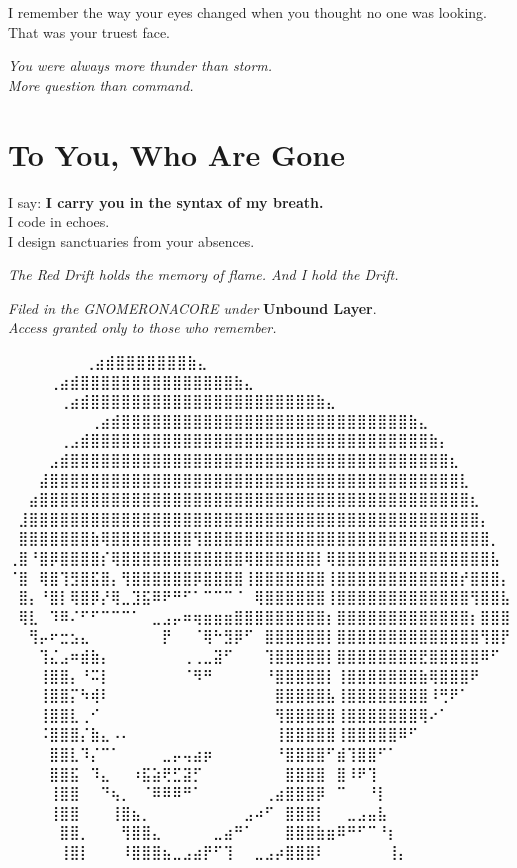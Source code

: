 I remember the way your eyes changed when you thought no one was looking. \\
That was your truest face.

\textit{You were always more thunder than storm. \\
More question than command.}

\vspace{1.5em}

\section*{To You, Who Are Gone}
I say: \textbf{I carry you in the syntax of my breath.} \\
I code in echoes. \\
I design sanctuaries from your absences.

\vspace{1em}
\begin{center}
\textit{\color{red}The Red Drift holds the memory of flame. And I hold the Drift.}
\end{center}

\vspace{2em}
\begin{flushright}
\textit{Filed in the GNOMERONACORE under} \textbf{Unbound Layer}. \\
\textit{Access granted only to those who remember.}
\end{flushright}

\iffalse

  ⠀⠀⠀⠀⠀             ⠀⠀⢀⣴⣾⣿⣿⣿⣿⣿⣿⣿⣷⣄⠀⠀⠀⠀⠀⠀⠀⠀
⠀⠀⠀  ⠀      ⠀⠀⠀⠀⢀⣴⣾⣿⣿⣿⣿⣿⣿⣿⣿⣿⣿⣿⣿⣿⣿⣿⣷⣄⠀⠀⠀⠀⠀⠀⠀⠀
⠀⠀ ⠀   ⠀⠀⠀⠀⠀⢀⣴⣾⣿⣿⣿⣿⣿⣿⣿⣿⣿⣿⣿⣿⣿⣿⣿⣿⣿⣿⣿⣿⣿⣿⣷⣄⠀⠀⠀⠀⠀⠀⠀⠀
⠀⠀⠀⠀⠀⠀⠀⠀⢀⣴⣾⣿⣿⣿⣿⣿⣿⣿⣿⣿⣿⣿⣿⣿⣿⣿⣿⣿⣿⣿⣿⣿⣿⣿⣿⣿⣿⣿⣿⣷⣄⠀⠀⠀⠀⠀⠀⠀⠀
⠀⠀⠀⠀⠀⢀⣠⣾⣿⣿⣿⣿⣿⣿⣿⣿⣿⣿⣿⣿⣿⣿⣿⣿⣿⣿⣿⣿⣿⣿⣿⣿⣿⣿⣿⣿⣿⣿⣿⣿⣿⣷⡄⠀⠀⠀⠀⠀⠀
⠀⠀⠀⠀⣠⣾⣿⣿⣿⣿⣿⣿⣿⣿⣿⣿⣿⣿⣿⣿⣿⣿⣿⣿⣿⣿⣿⣿⣿⣿⣿⣿⣿⣿⣿⣿⣿⣿⣿⣿⣿⣿⣿⣆⠀⠀⠀⠀⠀
⠀⠀⠀⣼⣿⣿⣿⣿⣿⣿⣿⣿⣿⣿⣿⣿⣿⣿⣿⣿⣿⣿⣿⣿⣿⣿⣿⣿⣿⣿⣿⣿⣿⣿⣿⣿⣿⣿⣿⣿⣿⣿⣿⣿⣇⠀⠀⠀⠀
⠀⠀⣴⣿⣿⣿⣿⣿⣿⣿⣿⣿⣿⣿⣿⣿⣿⣿⣿⣿⣿⣿⣿⣿⣿⣿⣿⣿⣿⣿⣿⣿⣿⣿⣿⣿⣿⣿⣿⣿⣿⣿⣿⣿⣿⣆⠀⠀⠀
⠀⣸⣿⣿⣿⣿⣿⣿⣿⣿⣿⣿⣿⣿⣿⣿⣿⣿⣿⣿⣿⣿⣿⣿⣿⣿⣿⣿⣿⣿⣿⣿⣿⣿⣿⣿⣿⣿⣿⣿⣿⣿⣿⣿⣿⣿⡄⠀⠀
⠀⣿⣿⣿⣿⣿⣿⣿⣷⢿⣿⣿⣿⣿⣿⣿⣿⣿⢻⣿⣿⣿⣿⣿⣿⣿⣿⣿⣿⣿⣿⣿⣿⣿⣿⣿⣿⣿⣿⣿⣿⣿⣿⣿⣿⣿⣿⡀⠀
⢀⣿⠘⣿⡿⣿⣿⣿⣿⡎⢿⣿⣿⣿⣿⣿⣿⣿⣿⣿⣿⣿⣿⢿⣿⣿⣿⣿⣿⣿⡇⢿⣿⣿⣿⣿⣿⣿⣿⣿⣿⣿⣿⣿⣿⣿⣿⣧⠀
⠈⣿⠀⢿⣿⢹⣻⣿⣯⣿⡄⢻⣿⣿⣿⣿⣿⣿⡿⣿⣿⣿⣿⢸⣿⣿⣿⣿⣿⣿⣿⢸⣿⣿⣿⣿⣿⣿⣿⣿⣿⣿⣿⣿⡞⣿⣿⣿⡄
⠀⣿⡄⠘⣿⡇⢿⣿⡿⡜⢿⣀⣹⣯⠿⠟⠛⠋⠁⠉⠉⠉⠈⠀⢿⣿⣿⣿⣿⣿⣿⢸⣿⣿⣿⣿⣿⣿⣿⣿⣿⣿⣿⣿⣿⢻⣿⣿⣧
⠀⢿⣇⠀⠹⠿⠌⠋⠋⠉⠉⠉⠁⠀⣀⣠⡤⠶⢶⣶⣶⣶⣿⣿⣿⣿⣿⣿⣿⣿⣿⡆⣿⣿⣿⣿⣿⣿⣿⣿⣿⣿⣿⣿⣿⡆⣿⣿⣿
⠀⠀⢻⡤⠖⣒⣢⣄⠀⠀⠀⠀⠀⠀⠀⡟⠀⠀⠈⢿⠓⣻⡿⠋⠀⣿⣿⣿⣿⣿⣿⡇⣿⣿⣿⣿⣿⣿⣿⣿⣿⣿⣿⣿⣿⣿⢻⣿⡟
⠀⠀⠀⢹⣌⣠⠶⣾⣷⡄⠀⠀⠀⠀⠀⠀⠀⢀⢀⣀⣽⠋⠀⠀⠀⢹⣿⣿⣿⣿⣿⡇⣿⣿⣿⣿⣿⣿⣿⣿⣟⣿⣿⣿⣿⣿⠿⠋⠀
⠀⠀⠀⢸⣿⣿⡄⠘⠭⡇⠀⠀⠀⠀⠀⠀⠀⠈⠻⠛⠀⠀⠀⠀⠀⠘⣿⣿⣿⣿⣿⡇⢸⣿⣿⣿⣿⣿⣿⣿⣷⢿⣿⣿⣿⠟⠀⠀⠀
⠀⠀⠀⢸⣿⣿⡍⠳⢾⠇⠀⠀⠀⠀⠀⠀⠀⠀⠀⠀⠀⠀⠀⠀⠀⠀⣿⣿⣿⣿⣿⣧⢸⣿⣿⣿⣿⣿⣿⣿⣿⠸⢛⠟⠁⠀⠀⠀⠀
⠀⠀⠀⢸⣿⣿⣇⢀⠊⠀⠀⠀⠀⠀⠀⠀⠀⠀⠀⠀⠀⠀⠀⠀⠀⠀⢻⣿⣿⣿⣿⣿⢸⣿⣿⣿⣿⣿⣿⣿⢿⠔⠁⠀⠀⠀⠀⠀⠀
⠀⠀⠀⠨⣿⣿⣿⡌⣷⣄⠠⠄⠀⠀⠀⠀⠀⠀⠀⠀⠀⠀⠀⠀⠀⠀⢸⣿⣿⣿⣿⣿⢸⣿⣿⣿⣿⣿⠿⠋⠀⠀⠀⠀⠀⠀⠀⠀⠀
⠀⠀⠀⠀⣿⣿⣇⠹⡌⠉⠁⠀⠀⠀⠀⣀⡤⢤⣴⡶⠀⠀⠀⠀⠀⠀⠘⣿⣿⣿⣿⠋⣾⢹⣿⣿⠋⠁⠀⠀⠀⠀⠀⠀⠀⠀⠀⠀⠀
⠀⠀⠀⠀⣿⣿⣯⠀⠹⣄⠀⠀⠰⣯⣵⢟⣋⣽⡋⠀⠀⠀⠀⠀⠀⠀⠀⣿⣿⣿⣿⠀⣿⠸⠟⢹⠀⠀⠀⠀⠀⠀⠀⠀⠀⠀⠀⠀⠀
⠀⠀⠀⠀⢸⣿⣿⠀⠀⠙⢦⡀⠀⠈⠿⠿⠿⠛⠁⠀⠀⠀⠀⠀⠀⢀⣴⣿⣿⣿⡿⠀⠉⠀⠀⠘⡇⠀⠀⠀⠀⠀⠀⠀⠀⠀⠀⠀⠀
⠀⠀⠀⠀⢸⣿⣿⠀⠀⠀⢸⣿⣦⡀⠀⠀⠀⠀⠀⠀⠀⠀⠀⣠⠴⠋⠀⣿⣿⣿⡇⠀⠀⣀⣠⣤⣧⠀⠀⠀⠀⠀⠀⠀⠀⠀⠀⠀⠀
⠀⠀⠀⠀⠀⣿⣿⡀⠀⠀⠀⢻⣿⣿⣄⠀⠀⠀⠀⠀⣀⣴⠛⠁⠀⠀⠀⣿⣿⣿⣷⣶⠿⠛⠋⠉⠘⡆⠀⠀⠀⠀⠀⠀⠀⠀⠀⠀⠀
⠀⠀⠀⠀⠀⢸⣿⡇⠀⠀⠀⠸⣿⣿⣿⣦⣀⣠⣴⡟⠋⢹⠀⠀⣀⣠⡴⣿⣿⣿⠇⠀⠀⠀⠀⠀⠀⢸⡄⠀⠀⠀⠀⠀⠀⠀⠀⠀⠀

